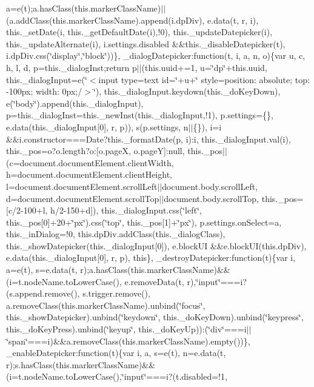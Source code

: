 \begin{DoxyCompactItemize}
a=e(t);a.\+has\+Class(this.\+marker\+Class\+Name)$\vert$$\vert$(a.\+add\+Class(this.\+marker\+Class\+Name).\+append(i.\+dp\+Div), e.\+data(t, r, i), this.\+\_\+set\+Date(i, this.\+\_\+get\+Default\+Date(i),!0), this.\+\_\+update\+Datepicker(i), this.\+\_\+update\+Alternate(i), i.\+settings.\+disabled \&\&this.\+\_\+disable\+Datepicker(t), i.\+dp\+Div.\+css(\char`\"{}display\char`\"{},\char`\"{}block\char`\"{}))\}, \+\_\+dialog\+Datepicker\+:function(t, i, a, n, o)\{var u, c, h, l, d, p=this.\+\_\+dialog\+Inst;return p$\vert$$\vert$(this.\+uuid+=1, u=\char`\"{}dp\char`\"{}+this.\+uuid, this.\+\_\+dialog\+Input=e(\char`\"{}$<$input type=\textquotesingle{}text\textquotesingle{} id=\textquotesingle{}\char`\"{}+u+\char`\"{}\textquotesingle{} style=\textquotesingle{}position\+: absolute; top\+: -\/100px; width\+: 0px;\textquotesingle{}/$>$\char`\"{}), this.\+\_\+dialog\+Input.\+keydown(this.\+\_\+do\+Key\+Down), e(\char`\"{}body\char`\"{}).\+append(this.\+\_\+dialog\+Input), p=this.\+\_\+dialog\+Inst=this.\+\_\+new\+Inst(this.\+\_\+dialog\+Input,!1), p.\+settings=\{\}, e.\+data(this.\+\_\+dialog\+Input\mbox{[}0\mbox{]}, r, p)), s(p.\+settings, n$\vert$$\vert$\{\}), i=i \&\&i.\+constructor===\+Date?this.\+\_\+format\+Date(p, i)\+:i, this.\+\_\+dialog\+Input.\+val(i), this.\+\_\+pos=o?o.\+length?o\+:\mbox{[}o.\+page\+X, o.\+page\+Y\mbox{]}\+:null, this.\+\_\+pos$\vert$$\vert$(c=document.\+document\+Element.\+client\+Width, h=document.\+document\+Element.\+client\+Height, l=document.\+document\+Element.\+scroll\+Left$\vert$$\vert$document.\+body.\+scroll\+Left, d=document.\+document\+Element.\+scroll\+Top$\vert$$\vert$document.\+body.\+scroll\+Top, this.\+\_\+pos=\mbox{[}c/2-\/100+l, h/2-\/150+d\mbox{]}), this.\+\_\+dialog\+Input.\+css(\char`\"{}left\char`\"{}, this.\+\_\+pos\mbox{[}0\mbox{]}+20+\char`\"{}px\char`\"{}).\+css(\char`\"{}top\char`\"{}, this.\+\_\+pos\mbox{[}1\mbox{]}+\char`\"{}px\char`\"{}), p.\+settings.\+on\+Select=a, this.\+\_\+in\+Dialog=!0, this.\+dp\+Div.\+add\+Class(this.\+\_\+dialog\+Class), this.\+\_\+show\+Datepicker(this.\+\_\+dialog\+Input\mbox{[}0\mbox{]}), e.\+block\+U\+I \&\&e.\+block\+U\+I(this.\+dp\+Div), e.\+data(this.\+\_\+dialog\+Input\mbox{[}0\mbox{]}, r, p), this\}, \+\_\+destroy\+Datepicker\+:function(t)\{var i, a=e(t), s=e.\+data(t, r);a.\+has\+Class(this.\+marker\+Class\+Name)\&\&(i=t.\+node\+Name.\+to\+Lower\+Case(), e.\+remove\+Data(t, r),\char`\"{}input\char`\"{}===i?(s.\+append.\+remove(), s.\+trigger.\+remove(), a.\+remove\+Class(this.\+marker\+Class\+Name).\+unbind(\char`\"{}focus\char`\"{}, this.\+\_\+show\+Datepicker).\+unbind(\char`\"{}keydown\char`\"{}, this.\+\_\+do\+Key\+Down).\+unbind(\char`\"{}keypress\char`\"{}, this.\+\_\+do\+Key\+Press).\+unbind(\char`\"{}keyup\char`\"{}, this.\+\_\+do\+Key\+Up))\+:(\char`\"{}div\char`\"{}===i$\vert$$\vert$\char`\"{}span\char`\"{}===i)\&\&a.\+remove\+Class(this.\+marker\+Class\+Name).\+empty())\}, \+\_\+enable\+Datepicker\+:function(t)\{var i, a, s=e(t), n=e.\+data(t, r);s.\+has\+Class(this.\+marker\+Class\+Name)\&\&(i=t.\+node\+Name.\+to\+Lower\+Case(),\char`\"{}input\char`\"{}===i?(t.\+disabled=!1, 
\end{DoxyCompactItemize}
